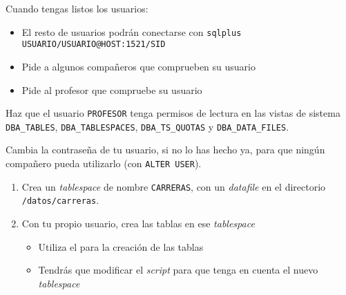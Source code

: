 \begin{homeworkProblem}
  Cuando tengas listos los usuarios:
  \begin{itemize}
    \item El resto de usuarios podrán conectarse con \texttt{sqlplus USUARIO/USUARIO@HOST:1521/SID}
    \item Pide a algunos compañeros que comprueben su usuario
    \item Pide al profesor que compruebe su usuario
  \end{itemize}
\end{homeworkProblem}

\begin{homeworkProblem}
  Haz que el usuario \texttt{PROFESOR} tenga permisos de lectura en las vistas de sistema \texttt{DBA\_TABLES}, \texttt{DBA\_TABLESPACES}, \texttt{DBA\_TS\_QUOTAS} y \texttt{DBA\_DATA\_FILES}.
\end{homeworkProblem}

\begin{homeworkProblem}
  Cambia la contraseña de tu usuario, si no lo has hecho ya, para que ningún compañero pueda utilizarlo (con \texttt{ALTER USER}).

  \begin{enumerate}
  \item Crea un \textit{tablespace} de nombre \texttt{CARRERAS}, con un \textit{datafile} en el directorio \texttt{/datos/carreras}.
  \item Con tu propio usuario, crea las tablas en ese \textit{tablespace}
    \begin{itemize}
    \item Utiliza el  para la creación de las tablas
    \item Tendrás que modificar el \textit{script} para que tenga en cuenta el nuevo \textit{tablespace}
    \end{itemize}
  \end{enumerate}
\end{homeworkProblem}

